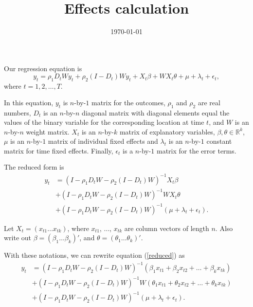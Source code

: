 \documentclass[11pt,a4paper]{amsart}
\theoremstyle{plain}
\theoremstyle{definition}
\begin{document}
\title{Effects calculation}
\date{\today}
\maketitle

Our regression equation is 
\begin{equation}
	y_{t} = \rho_{1} D_{t}Wy_{t} + \rho_{2}(I-D_{t})Wy_{t} + X_{t}\beta + WX_{t}\theta + \mu + \lambda_{t} + \epsilon_{t}, 
\end{equation}
where $t = 1,2, \dots, T$. 

In this equation, $y_{t}$ is $n$-by-$1$ matrix for the outcomes, $\rho_{1}$ and $\rho_{2}$ are real numbers, $D_{t}$ is an $n$-by-$n$ diagonal matrix with diagonal elements equal the values of the binary variable for the corresponding location at time $t$, and $W$ is an $n$-by-$n$ weight matrix. $X_{t}$ is an $n$-by-$k$ matrix of explanatory variables, $\beta, \theta \in \mathbb{R}^{k}$, $\mu$ is an  $n$-by-$1$ matrix of individual fixed effects and $\lambda_{t}$ is an  $n$-by-$1$ constant matrix  for time fixed effects. Finally, $\epsilon_{t}$ is a  $n$-by-$1$ matrix for the error terms.

The reduced form is 
\begin{equation}\label{reduced}
	\begin{aligned}
			y_{t} &= (I-\rho_{1}D_{t}W-\rho_{2}(I-D_{t})W)^{-1}X_{t}\beta \\
			&+  (I-\rho_{1}D_{t}W-\rho_{2}(I-D_{t})W)^{-1}WX_{t}\theta \\
			&+  (I-\rho_{1}D_{t}W-\rho_{2}(I-D_{t})W)^{-1}(\mu + \lambda_{t} + \epsilon_{t}).
	\end{aligned}
\end{equation}

Let $X_{t} = (x_{t1} \dots x_{tk})$, where $x_{t1}$, $\dots$, $x_{tk}$ are  column vectors of length $n$.  Also write out $\beta = (\beta_{1} \dots \beta_{k})'$, and $\theta = (\theta_{1} \dots \theta_{k})'$.

With these notations, we can rewrite equation (\ref{reduced}) as 
\begin{equation}
	\begin{aligned}
		y_{t} &= (I-\rho_{1}D_{t}W-\rho_{2}(I-D_{t})W)^{-1}(\beta_{1}x_{t1} + \beta_{2}x_{t2} + \dots + \beta_{k}x_{tk}) \\
		&+  (I-\rho_{1}D_{t}W-\rho_{2}(I-D_{t})W)^{-1}W(\theta_{1}x_{t1} + \theta_{2}x_{t2} + \dots + \theta_{k}x_{tk}) \\
		&+  (I-\rho_{1}D_{t}W-\rho_{2}(I-D_{t})W)^{-1}(\mu + \lambda_{t} + \epsilon_{t}).
	\end{aligned}
\end{equation}
\end{document}
